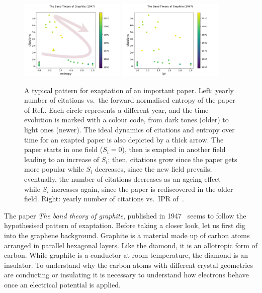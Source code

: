 \documentclass[draft,final]{vutinfth} %
\begin{document}
%
\begin{figure}[t]
    \centering
    \includegraphics[width=0.45\textwidth]{figures_exaptation/graphene-entropy.pdf}%
    \includegraphics[width=0.45\textwidth]{figures_exaptation/graphene-ipr.pdf}
    \caption{A typical pattern for exaptation of an important paper.
    {Left:} yearly number of citations vs.\ the forward normalised entropy of the paper of Ref.\cite{graphite1947}. Each circle represents a different year, and the time-evolution is marked with a colour code, from dark tones (older) to light ones (newer). The ideal dynamics of citations and entropy over time for an exapted paper is also depicted by a thick arrow.
    The paper starts in one field ($S_i=0$), then is exapted in another field leading to an increase of $S_i$; then, citations grow since the paper gets more popular while $S_i$ decreases, since the new field prevails; eventually, the number of citations decreases as an ageing effect while $S_i$ increases again, since the paper is rediscovered in the older field.
    {Right:} yearly number of citations vs.\ IPR of~\cite{graphite1947}.}
    \label{fig:graphene}
\end{figure}
%
The paper \emph{The band theory of graphite}, published in 1947~\cite{graphite1947} seems to follow the hypothesised pattern of exaptation. 
Before taking a closer look, let us first dig into the graphene background.
%
Graphite is a material made up of carbon atoms arranged in parallel hexagonal layers. 
Like the diamond, it is an allotropic form of carbon. 
While graphite is a conductor at room temperature, the diamond is an insulator. 
To understand why the carbon atoms with different crystal geometries are conducting or insulating it is necessary to understand how electrons behave once an electrical potential is applied.
\end{document}
